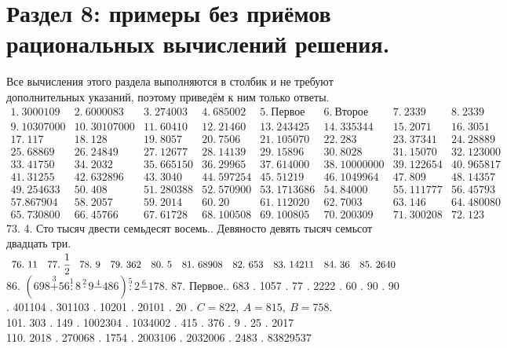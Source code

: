 \documentclass[12pt]{article}
\begin{document}
\section{Раздел 8: примеры без приёмов рациональных вычислений решения.}
Все вычисления этого раздела выполняются в столбик и не требуют дополнительных указаний, поэтому приведём к ним только ответы.
$\begin{array}{lllllllllll}
1.\ 3000109& 2.\ 6000083& 3.\ 274003& 4.\ 685002& 5.\ \text{Первое}& 6.\ \text{Второе}& 7.\ 2339& 8.\ 2339\\ 9.\ 10307000&
10.\ 30107000& 11.\ 60410& 12.\ 21460& 13.\ 243425& 14.\ 335344& 15.\ 2071&
16.\ 3051\\ 17.\ 117& 18.\ 128&
19.\ 8057& 20.\ 7506& 21.\ 105070& 22.\ 283& 23.\ 37341& 24.\ 28889\\
25.\ 68869& 26.\ 24849& 27.\ 12677& 28.\ 14139& 29.\ 15896& 30.\ 8028&
31.\ 15070& 32.\ 123000\\
33.\ 41750& 34.\ 2032& 35.\ 665150& 36.\ 29965& 37.\ 614000& 38.\ 10000000&
39.\ 122654& 40.\ 965817\\ 41.\ 31255& 42.\ 632896& 43.\ 3040& 44.\ 597254&
45.\ 51219& 46.\ 1049964& 47.\ 809& 48.\ 14357\\
49.\ 254633& 50.\ 408& 51.\ 280388& 52.\ 570900& 53.\ 1713686& 54.\ 84000&
55.\ 111777& 56.\ 45793\\ 57. 867904& 58.\ 2057& 59.\ 2014& 60.\ 20&
61.\ 112020& 62.\ 7003& 63.\ 146& 64.\ 480080\\
65.\ 730800& 66.\ 45766& 67.\ 61728& 68.\ 100508& 69.\ 100805& 70.\ 200309&
71.\ 300208& 72.\ 123 \end{array}$\\
73. 4. Сто тысяч двести семьдесят восемь.. Девяносто девять тысяч семьсот двадцать три.\\
$\begin{array}{lllllllllllll}
76.\ 11& 77.\ \cfrac{1}{2}& 78.\ 9 &79.\ 362& 80.\ 5& 81.\ 68908&
82.\ 653& 83.\ 14211&
84.\ 36& 85.\ 2640
\end{array}$\\
86. $(698\stackrel{3}{+}56\stackrel{1}{:}8\stackrel{2}{\cdot}9\stackrel{4}{-}486)\stackrel{5}{:}2\stackrel{6}{-}178.$
87. Первое.. 683 . 1057 . 77 . 2222 . 60 . 90 . 90 . 401104 . 301103 . 10201 . 20101 . 20 . $C=822,\ A=815,\ B=758.$ \\ 101. 303 . 149 . 1002304 . 1034002 . 415 . 376 . 9 . 25 . 2017 \\ 110. 2018 . 270068 . 1754 . 2003106 . 2032006 . 2483 . 83829537\\
\end{document}
